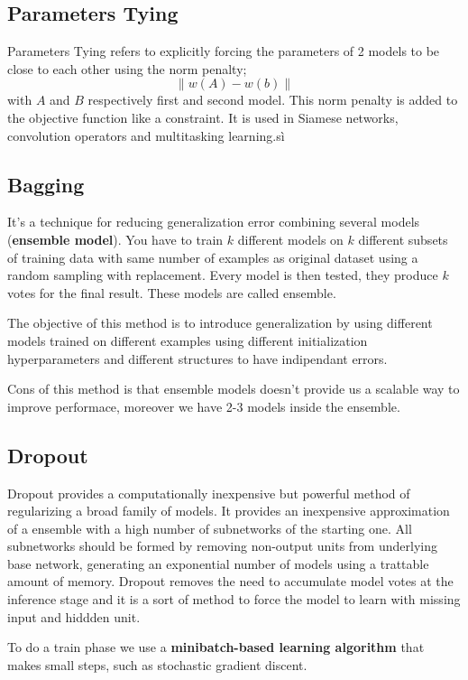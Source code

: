 \subsection{Parameters Tying}
Parameters Tying refers to explicitly forcing the parameters of 2 models to be close to each other
using the norm penalty;
$$\|w(A)- w(b)\|$$
with $A$ and $B$ respectively first and second model. This norm penalty is added 
to the objective function like a constraint. It is used in Siamese networks, convolution 
operators and multitasking learning.sì

\subsection{Bagging}
It's a technique for reducing generalization error combining several models (\textbf{ensemble model}). 
You have to train $k$ different models on $k$ different subsets of training data
with same number of examples as original dataset using a random sampling with replacement.
Every model is then tested, they produce $k$ votes for the final result. These 
models are called ensemble.

The objective of this method is to introduce generalization by using different models 
trained on different examples using different initialization hyperparameters and different 
structures to have indipendant errors.

Cons of this method is that ensemble models doesn't provide us a scalable way to 
improve performace, moreover we have 2-3 models inside the ensemble.

\subsection{Dropout}
Dropout provides a computationally inexpensive but powerful method of regularizing
a broad family of models. It provides an inexpensive approximation of a ensemble with 
a high number of subnetworks of the starting one. All subnetworks should be formed by removing 
non-output units from underlying base network, generating an exponential number of 
models using a trattable amount of memory. Dropout removes the need to 
accumulate model votes at the inference stage and it is a sort of method to force the 
model to learn with missing input and hiddden unit.

To do a train phase we use a \textbf{minibatch-based learning algorithm} that makes 
small steps, such as stochastic gradient discent.

